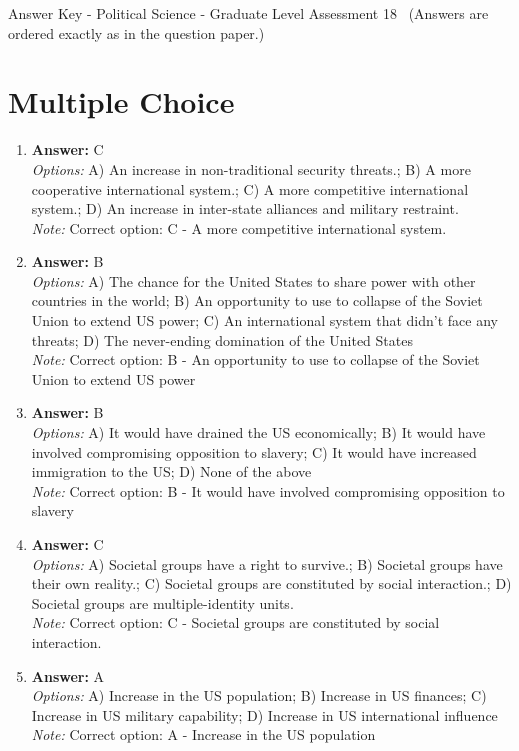 \documentclass[12pt]{article}
\begin{document}
\begin{center}
Answer Key - Political Science - Graduate Level Assessment 18 \
\small (Answers are ordered exactly as in the question paper.)
\end{center}

\section*{Multiple Choice}
\begin{enumerate}[label=\arabic*.]
\item \textbf{Answer:} C
\\ \textit{Options:} A) An increase in non-traditional security threats.; B) A more cooperative international system.; C) A more competitive international system.; D) An increase in inter-state alliances and military restraint.
\\ \textit{Note:} Correct option: C - A more competitive international system.
\item \textbf{Answer:} B
\\ \textit{Options:} A) The chance for the United States to share power with other countries in the world; B) An opportunity to use to collapse of the Soviet Union to extend US power; C) An international system that didn't face any threats; D) The never-ending domination of the United States
\\ \textit{Note:} Correct option: B - An opportunity to use to collapse of the Soviet Union to extend US power
\item \textbf{Answer:} B
\\ \textit{Options:} A) It would have drained the US economically; B) It would have involved compromising opposition to slavery; C) It would have increased immigration to the US; D) None of the above
\\ \textit{Note:} Correct option: B - It would have involved compromising opposition to slavery
\item \textbf{Answer:} C
\\ \textit{Options:} A) Societal groups have a right to survive.; B) Societal groups have their own reality.; C) Societal groups are constituted by social interaction.; D) Societal groups are multiple-identity units.
\\ \textit{Note:} Correct option: C - Societal groups are constituted by social interaction.
\item \textbf{Answer:} A
\\ \textit{Options:} A) Increase in the US population; B) Increase in US finances; C) Increase in US military capability; D) Increase in US international influence
\\ \textit{Note:} Correct option: A - Increase in the US population
\end{enumerate}
\end{document}
